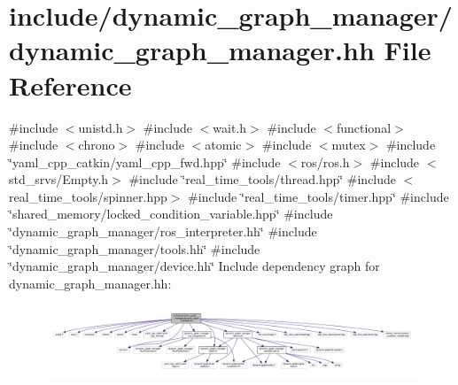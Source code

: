 \hypertarget{dynamic__graph__manager_8hh}{}\section{include/dynamic\+\_\+graph\+\_\+manager/dynamic\+\_\+graph\+\_\+manager.hh File Reference}
\label{dynamic__graph__manager_8hh}
{\ttfamily \#include $<$unistd.\+h$>$}\newline
{\ttfamily \#include $<$wait.\+h$>$}\newline
{\ttfamily \#include $<$functional$>$}\newline
{\ttfamily \#include $<$chrono$>$}\newline
{\ttfamily \#include $<$atomic$>$}\newline
{\ttfamily \#include $<$mutex$>$}\newline
{\ttfamily \#include \char`\"{}yaml\+\_\+cpp\+\_\+catkin/yaml\+\_\+cpp\+\_\+fwd.\+hpp\char`\"{}}\newline
{\ttfamily \#include $<$ros/ros.\+h$>$}\newline
{\ttfamily \#include $<$std\+\_\+srvs/\+Empty.\+h$>$}\newline
{\ttfamily \#include \char`\"{}real\+\_\+time\+\_\+tools/thread.\+hpp\char`\"{}}\newline
{\ttfamily \#include $<$real\+\_\+time\+\_\+tools/spinner.\+hpp$>$}\newline
{\ttfamily \#include \char`\"{}real\+\_\+time\+\_\+tools/timer.\+hpp\char`\"{}}\newline
{\ttfamily \#include \char`\"{}shared\+\_\+memory/locked\+\_\+condition\+\_\+variable.\+hpp\char`\"{}}\newline
{\ttfamily \#include \char`\"{}dynamic\+\_\+graph\+\_\+manager/ros\+\_\+interpreter.\+hh\char`\"{}}\newline
{\ttfamily \#include \char`\"{}dynamic\+\_\+graph\+\_\+manager/tools.\+hh\char`\"{}}\newline
{\ttfamily \#include \char`\"{}dynamic\+\_\+graph\+\_\+manager/device.\+hh\char`\"{}}\newline
Include dependency graph for dynamic\+\_\+graph\+\_\+manager.\+hh\+:
\nopagebreak
\begin{figure}[H]
\begin{center}
\leavevmode
\includegraphics[width=350pt]{dynamic__graph__manager_8hh__incl}
\end{center}
\end{figure}
